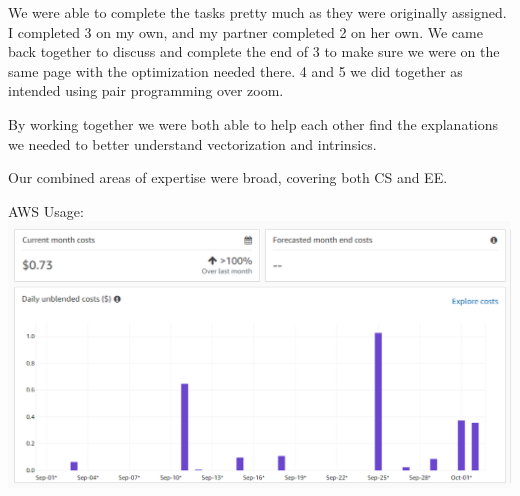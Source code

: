 \documentclass[
  course = {{ESE532 System-on-a-Chip}},
  quartile = {{}},
  assignment = 4,
  name = {{Sheil Sarda, Kate Ballard}},
  studentnumber = {{}},
  email = {{sheils@seas.upenn.edu, kballard@seas.upenn.edu}},
  firstexercise = 1
]{aga-homework}
\begin{document}
\subexercise
We were able to complete the tasks pretty much as they were originally assigned.  I completed 3 on my own, and my partner completed 2 on her own.  We came back together to discuss and complete the end of 3 to make sure we were on the same page with the optimization needed there.  4 and 5 we did together as intended using pair programming over zoom.

\subexercise
By working together we were both able to help each other find the explanations we needed to better understand vectorization and intrinsics.

\subexercise
Our combined areas of expertise were broad, covering both CS and EE.

\subexercise
AWS Usage:	
	\includegraphics[scale=0.5]{figures/AWS_Usage}
	
\end{document}
